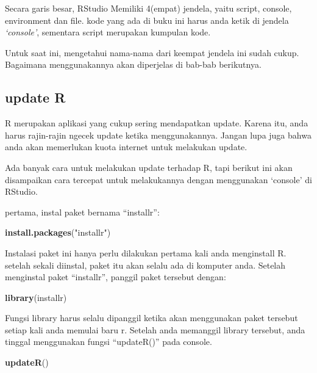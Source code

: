 \documentclass[
]{book}
\newenvironment{Shaded}{\begin{snugshade}}{\end{snugshade}}
\newcommand{\KeywordTok}[1]{\textcolor[rgb]{0.13,0.29,0.53}{\textbf{#1}}}
\newcommand{\NormalTok}[1]{#1}
\newcommand{\StringTok}[1]{\textcolor[rgb]{0.31,0.60,0.02}{#1}}
\begin{document}
Secara garis besar, RStudio Memiliki 4(empat) jendela, yaitu script, console, environment dan file. kode yang ada di buku ini harus anda ketik di jendela \emph{`console'}, sementara script merupakan kumpulan kode.

Untuk saat ini, mengetahui nama-nama dari keempat jendela ini sudah cukup. Bagaimana menggunakannya akan diperjelas di bab-bab berikutnya.

\hypertarget{update-r}{%
\subsection{update R}\label{update-r}}

R merupakan aplikasi yang cukup sering mendapatkan update. Karena itu, anda harus rajin-rajin ngecek update ketika menggunakannya. Jangan lupa juga bahwa anda akan memerlukan kuota internet untuk melakukan update.

Ada banyak cara untuk melakukan update terhadap R, tapi berikut ini akan disampaikan cara tercepat untuk melakukannya dengan menggunakan `console' di RStudio.

pertama, instal paket bernama ``installr'':

\begin{Shaded}
\begin{Highlighting}[]
\KeywordTok{install.packages}\NormalTok{(}\StringTok{"installr"}\NormalTok{)}
\end{Highlighting}
\end{Shaded}

Instalasi paket ini hanya perlu dilakukan pertama kali anda menginstall R. setelah sekali diinstal, paket itu akan selalu ada di komputer anda. Setelah menginstal paket ``installr'', panggil paket tersebut dengan:

\begin{Shaded}
\begin{Highlighting}[]
\KeywordTok{library}\NormalTok{(installr)}
\end{Highlighting}
\end{Shaded}

Fungsi library harus selalu dipanggil ketika akan menggunakan paket tersebut setiap kali anda memulai baru r. Setelah anda memanggil library tersebut, anda tinggal menggunakan fungsi ``updateR()'' pada console.

\begin{Shaded}
\begin{Highlighting}[]
\KeywordTok{updateR}\NormalTok{()}
\end{Highlighting}
\end{Shaded}
\end{document}
